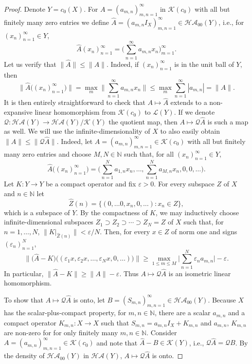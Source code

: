 \documentclass[11pt]{amsart}
\theoremstyle{definition}
\newcommand{\N}{\mathbb{N}}
\newcommand{\e}{\varepsilon}
\numberwithin{equation}{section}
\begin{document}
\begin{proof}
Denote $Y=c_0(X)$. For $A = (a_{m,n})_{m,n=1}^\infty$ in $\mathcal{K}(c_0)$ with all but finitely many zero entries we define $\hat A = (a_{m,n}I_X)_{m,n=1}^\infty\in\mathcal{HA}_{00}(Y)$, i.e., for $(x_n)_{n=1}^\infty\in Y$,
\[\hat A (x_n)_{n=1}^\infty = \Big(\sum_{n=1}^\infty a_{m,n}x_n\Big)_{m=1}^\infty.\]
Let us verify that $\|\hat A\|\leq \|A\|$. Indeed, if $(x_n)_{n=1}^\infty$ is in the unit ball of $Y$, then
\[\big\|\hat A\big((x_n)_{n=1}^\infty\big)\big\| = \max_m\Big\|\sum_{n=1}^\infty a_{m,n}x_n\Big\| \leq \max_m\sum_{n=1}^\infty |a_{m,n}| = \|A\|.\]
It is then entirely straightforward to check that $A\mapsto \hat A$ extends to a non-expansive linear homomorphism from $\mathcal{K}(c_0)$ to $\mathcal{L}(Y)$. If we denote $\mathcal{Q}:\mathcal{HA}(Y)\to \mathcal{HA}(Y)/\mathcal{K}(Y)$ the quotient map, then $A\mapsto \mathcal{Q}\hat A$ is such a map as well. We will use the infinite-dimensionality of $X$ to also easily obtain $\|A\| \leq \|\mathcal{Q}\hat A\|$. Indeed, let $A = (a_{m,n})_{m,n=1}^\infty\in\mathcal{K}(c_0)$ with all but finitely many zero entries and choose $M,N\in\N$ such that, for all $(x_n)_{n=1}^\infty\in Y$,
\[\hat A\big((x_n)_{n=1}^\infty\big) = \Big(\sum_{n=1}^Na_{1,n}x_n,\ldots,\sum_{n=1}^Na_{M,n}x_n,0,0,\ldots\Big).\]
Let $K:Y\to Y$ be a compact operator and fix $\e>0$. For every subspace $Z$ of $X$ and $n\in\N$ let
\[\hat Z(n) = \big\{(0,\ldots0,x_n,0,\ldots):x_n\in Z\big\},\]
which is a subspace of $Y$. By the compactness of $K$, we may inductively choose infinite-dimensional subspaces $Z_1\supset Z_2\supset\cdots\supset Z_N = Z$ of $X$ such that, for $n=1,\ldots,N$, $\|K|_{\hat Z(n)}\|<\e/N$. Then, for every $x\in Z$ of norm one and signs $(\e_n)_{n=1}^N$,
\[\Big\|\big(\hat A-K\big)\big((\e_1x,\e_2x,\ldots,\e_Nx,0,\ldots)\big)\Big\| \geq \max_{1\leq m\leq M}\Big|\sum_{n=1}^N\e_na_{m,n}\Big| - \e.\]
In particular, $\|\hat A - K\| \geq \|A\| - \e$. Thus $A\mapsto \mathcal{Q}\hat A$ is an isometric linear homomorphism.

To show that $A\mapsto \mathcal{Q}\hat A$ is onto, let $B = (S_{m,n})_{m,n=1}^\infty\in\mathcal{HA}_{00}(Y)$. Because $X$ has the scalar-plus-compact property, for $m,n\in\N$, there are a scalar $a_{m,n}$ and a compact operator $K_{m,n}:X\to X$ such that $S_{m,n}=a_{m,n}I_X + K_{m,n}$ and $a_{m,n}$, $K_{m,n}$ are non-zero for for only finitely many $m,n\in\N$. Consider $A = (a_{m,n})_{m,n=1}^\infty\in\mathcal{K}(c_0)$ and note that $\hat A - B\in\mathcal{K}(Y)$, i.e., $\mathcal{Q}\hat A = \mathcal{Q}B$. By the density of $\mathcal{HA}_{00}(Y)$ in $\mathcal{HA}(Y)$, $A\mapsto \mathcal{Q}\hat A$ is onto.
\end{proof}
\end{document}
